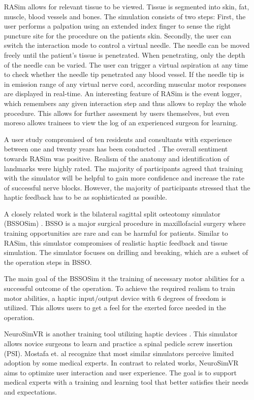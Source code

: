 RASim allows for relevant tissue to be viewed.
Tissue is segmented into skin, fat, muscle, blood vessels and bones.
The simulation consists of two steps: First, the user performs a palpation using an extended index finger to sense the right puncture site for the procedure on the patients skin.
Secondly, the user can switch the interaction mode to control a virtual needle.
The needle can be moved freely until the patient's tissue is penetrated.
When penetrating, only the depth of the needle can be varied.
The user can trigger a virtual aspiration at any time to check whether the needle tip penetrated any blood vessel.
If the needle tip is in emission range of any virtual nerve cord, according muscular motor responses are displayed in real-time.
An interesting feature of RASim is the event logger, which remembers any given interaction step and thus allows to replay the whole procedure.
This allows for further assesment by users themselves, but even moreso allows trainees to view the log of an experienced surgeon for learning.

A user study compromised of ten residents and consultants with experience between one and twenty years has been conducted \cite{RN72}.
The overall sentiment towards RASim was positive. Realism of the anatomy and identification of landmarks were highly rated. 
The majority of participants agreed that training with the simulator will be helpful to gain more confidence and increase the rate of successful nerve blocks.
However, the majority of participants stressed that the haptic feedback has to be as sophisticated as possible.

A closely related work is the bilateral sagittal split osteotomy simulator (BSSOSim) \cite{RN69}.
BSSO is a major surgical procedure in maxillofacial surgery where training opportunities are rare and can be harmful for patients.
Similar to RASim, this simulator compromises of realistic haptic feedback and tissue simulation.
The simulator focuses on drilling and breaking, which are a subset of the operation steps in BSSO.

The main goal of the BSSOSim it the training of necessary motor abilities for a successful outcome of the operation.
To achieve the required realism to train motor abilities, a haptic input/output device with 6 degrees of freedom is utilized.
This allows users to get a feel for the exerted force needed in the operation.

NeuroSimVR is another training tool utilizing haptic devices \cite{RN71}.
This simulator allows novice surgeons to learn and practice a spinal pedicle screw insertion (PSI).
Mostafa et. al recognize that most similar simulators perceive limited adoption by some medical experts.
In contrast to related works, NeuroSimVR aims to optimize user interaction and user experience.
The goal is to support medical experts with a training and learning tool that better satisfies their needs and expectations.

